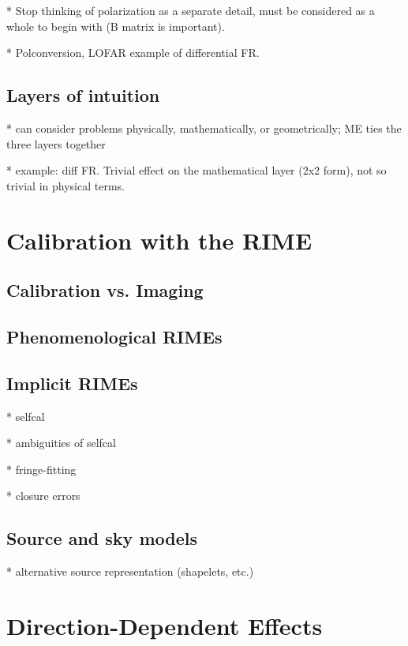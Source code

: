 \documentclass[]{aa}
\begin{document}
* Stop thinking of polarization as a separate detail, must be considered as a whole to begin with (B matrix is important).

* Polconversion, LOFAR example of differential FR.

\subsection{Layers of intuition}

* can consider problems physically, mathematically, or geometrically; ME ties the three layers together

* example: diff FR. Trivial effect on the mathematical layer (2x2 form), not so trivial in physical terms.


\section{\label{sec:calibration}Calibration with the RIME}

\subsection{Calibration vs. Imaging}

\subsection{Phenomenological RIMEs}

\subsection{\label{sec:implicit-mes}Implicit RIMEs}

* selfcal

* ambiguities of selfcal

* fringe-fitting

* closure errors

\subsection{\label{sec:lsm}Source and sky models}

* alternative source representation (shapelets, etc.)

\section{\label{sec:ddes}Direction-Dependent Effects}
\end{document}
